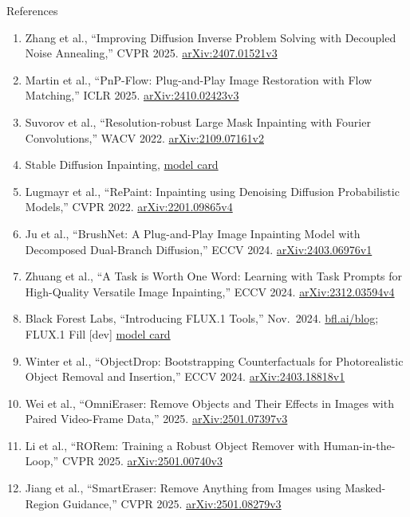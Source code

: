 \begin{frame}[allowframebreaks=0.9]{References}
\begin{enumerate}
    \item Zhang et al., ``Improving Diffusion Inverse Problem Solving with Decoupled Noise Annealing,'' CVPR 2025. \href{https://arxiv.org/abs/2407.01521v3}{arXiv:2407.01521v3}
    \item Martin et al., ``PnP-Flow: Plug-and-Play Image Restoration with Flow Matching,'' ICLR 2025. \href{https://arxiv.org/abs/2410.02423v3}{arXiv:2410.02423v3}
    \item Suvorov et al., ``Resolution-robust Large Mask Inpainting with Fourier Convolutions,'' WACV 2022. \href{https://arxiv.org/abs/2109.07161v2}{arXiv:2109.07161v2}
    \item Stable Diffusion Inpainting, \href{https://huggingface.co/stable-diffusion-v1-5/stable-diffusion-inpainting}{model card}
    \item Lugmayr et al., ``RePaint: Inpainting using Denoising Diffusion Probabilistic Models,'' CVPR 2022. \href{https://arxiv.org/abs/2201.09865v4}{arXiv:2201.09865v4}
    \item Ju et al., ``BrushNet: A Plug-and-Play Image Inpainting Model with Decomposed Dual-Branch Diffusion,'' ECCV 2024. \href{https://arxiv.org/abs/2403.06976v1}{arXiv:2403.06976v1}
    \item Zhuang et al., ``A Task is Worth One Word: Learning with Task Prompts for High-Quality Versatile Image Inpainting,'' ECCV 2024. \href{https://arxiv.org/abs/2312.03594v4}{arXiv:2312.03594v4}
    \item Black Forest Labs, ``Introducing FLUX.1 Tools,'' Nov.\ 2024. \href{https://bfl.ai/blog/24-11-21-tools}{bfl.ai/blog}; FLUX.1 Fill [dev] \href{https://huggingface.co/black-forest-labs/FLUX.1-Fill-dev}{model card}
    \item Winter et al., ``ObjectDrop: Bootstrapping Counterfactuals for Photorealistic Object Removal and Insertion,'' ECCV 2024. \href{https://arxiv.org/abs/2403.18818v1}{arXiv:2403.18818v1}
    \item Wei et al., ``OmniEraser: Remove Objects and Their Effects in Images with Paired Video-Frame Data,'' 2025. \href{https://arxiv.org/abs/2501.07397v3}{arXiv:2501.07397v3}
    \item Li et al., ``RORem: Training a Robust Object Remover with Human-in-the-Loop,'' CVPR 2025. \href{https://arxiv.org/abs/2501.00740v3}{arXiv:2501.00740v3}
    \item Jiang et al., ``SmartEraser: Remove Anything from Images using Masked-Region Guidance,'' CVPR 2025. \href{https://arxiv.org/abs/2501.08279v3}{arXiv:2501.08279v3}

\end{enumerate}
\end{frame}

